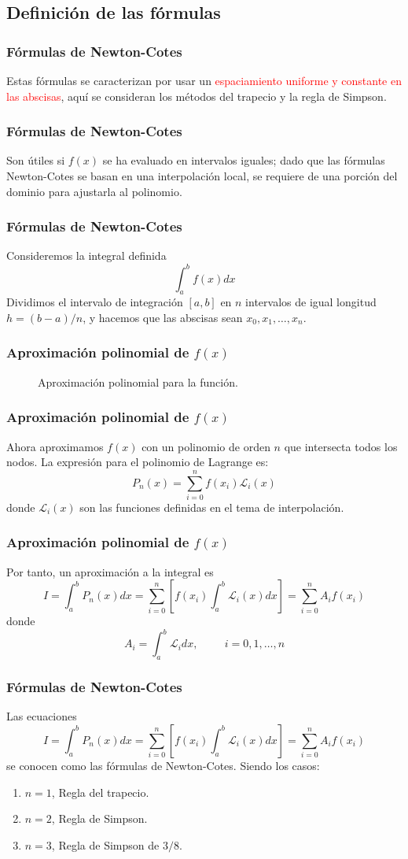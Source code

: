 \subsection{Definición de las fórmulas}
\begin{frame}
\frametitle{Fórmulas de Newton-Cotes}
Estas fórmulas se caracterizan por usar un \textcolor{red}{espaciamiento uniforme y constante en las abscisas}, aquí se consideran los métodos del trapecio y la regla de Simpson.
\end{frame}
\begin{frame}
\frametitle{Fórmulas de Newton-Cotes}
Son útiles si $f(x)$ se ha evaluado en intervalos iguales; dado que las fórmulas Newton-Cotes se basan en una interpolación local, se requiere de una porción del dominio para ajustarla al polinomio.
\end{frame}
\begin{frame}
\frametitle{Fórmulas de Newton-Cotes}
Consideremos la integral definida
\[\int_{a}^{b} f(x)dx\]
Dividimos el intervalo de integración $[a,b]$ en $n$ intervalos de igual longitud $h=(b-a)/n$, y hacemos que las abscisas sean $x_{0},x_{1},\ldots,x_{n}$.
\end{frame}
\begin{frame}
\frametitle{Aproximación polinomial de $f(x)$}
	\begin{figure}
		\centering
		
		\caption{Aproximación polinomial para la función.}
	\end{figure}
\end{frame}
\begin{frame}
\frametitle{Aproximación polinomial de $f(x)$}
Ahora aproximamos $f(x)$ con un polinomio de orden $n$ que intersecta todos los nodos. La expresión para el polinomio de Lagrange es:
\[P_{n}(x) = \sum_{i=0}^{n} f(x_{i})\mathcal{L}_{i}(x) \]
donde $\mathcal{L}_{i}(x)$ son las funciones definidas en el tema de interpolación. 
\end{frame}
\begin{frame}
\frametitle{Aproximación polinomial de $f(x)$}
Por tanto, un aproximación a la integral es
\fontsize{12}{12}\selectfont
\[I = \int_{a}^{b} P_{n}(x) dx = \sum_{i=0}^{n} \left[ f(x_{i}) \int_{a}^{b} \mathcal{L}_{i}(x) dx \right] = \sum_{i=0}^{n} A_{i} f(x_{i})\]
\fontsize{14}{14}\selectfont
donde
\[A_{i} = \int_{a}^{b} \mathcal{L}_{i} dx, \hspace{1cm} i=0,1,\ldots,n\]
\end{frame}
\begin{frame}
\frametitle{Fórmulas de Newton-Cotes}
Las ecuaciones
\fontsize{12}{12}\selectfont
\[I = \int_{a}^{b} P_{n}(x) dx = \sum_{i=0}^{n} \left[ f(x_{i}) \int_{a}^{b} \mathcal{L}_{i}(x) dx \right] = \sum_{i=0}^{n} A_{i} f(x_{i})\]
\fontsize{14}{14}\selectfont
\pause
se conocen como las fórmulas de Newton-Cotes. Siendo los casos:
	\begin{enumerate}[<+->]
		\item $n=1$, Regla del trapecio.
		\item $n=2$, Regla de Simpson.
		\item $n=3$, Regla de Simpson de $3/8$.
	\end{enumerate}
\end{frame}
